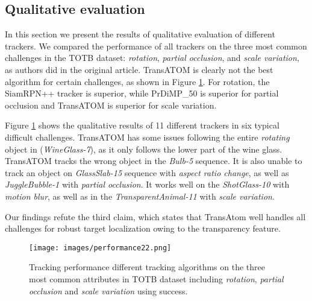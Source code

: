 \subsection{Qualitative evaluation}
\label{sec:result2}
In this section we present the results of qualitative evaluation of different trackers. We compared the performance of all trackers on the three most common challenges in the TOTB dataset: \textit{rotation}, \textit{partial occlusion}, and \textit{scale variation}, as authors did in the original article. TransATOM is clearly not the best algorithm for certain challenges, as shown in Figure \ref{fig:2}. For rotation, the SiamRPN++ tracker is superior, while PrDiMP\_50 is superior for partial occlusion and TransATOM is superior for scale variation.

Figure \ref{fig:2} shows the qualitative results of 11 different trackers in six typical difficult challenges. TransATOM has some issues following the entire \textit{rotating} object in (\textit{WineGlass-7}), as it only follows the lower part of the wine glass. TransATOM tracks the wrong object in the \textit{Bulb-5} sequence. It is also unable to track an object on \textit{GlassSlab-15} sequence with \textit{aspect ratio change}, as well as \textit{JuggleBubble-1} with \textit{partial occlusion}. It works well on the \textit{ShotGlass-10} with \textit{motion blur}, as well as in the \textit{TransparentAnimal-11} with \textit{scale variation}.

Our findings refute the third claim, which states that TransAtom well handles all challenges for robust target localization owing to the transparency feature.

\begin{figure}[h]
\caption{Tracking performance different tracking algorithms on the three most common attributes in TOTB dataset including \textit{rotation}, \textit{partial occlusion} and \textit{scale variation} using success.}
\label{fig:2}
\centering
\texttt{[image: images/performance22.png]}
\end{figure}

